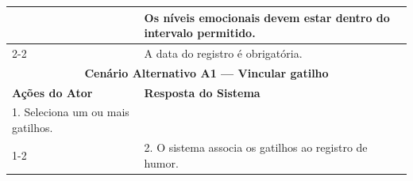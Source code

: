 \begin{longtable}{| p{} | p{} |}
&
Os níveis emocionais devem estar dentro do intervalo permitido. \\
\cline{2-2}

&
A data do registro é obrigatória. \\
\hline

\multicolumn{2}{|c|}{\textbf{Cenário Alternativo A1 --- Vincular gatilho}}\\
\hline
\textbf{Ações do Ator} &
\textbf{Resposta do Sistema} \\
\hline

1. Seleciona um ou mais gatilhos. & \\
\cline{1-2}

&
2. O sistema associa os gatilhos ao registro de humor. \\
\hline

\end{longtable}
